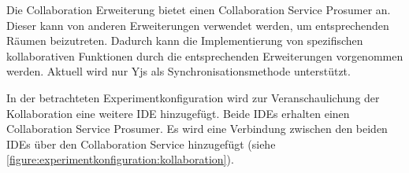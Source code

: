 Die Collaboration Erweiterung bietet einen Collaboration Service Prosumer an. Dieser kann von anderen Erweiterungen verwendet werden, um entsprechenden Räumen beizutreten. Dadurch kann die Implementierung von spezifischen kollaborativen Funktionen durch die entsprechenden Erweiterungen vorgenommen werden. Aktuell wird nur Yjs als Synchronisationsmethode unterstützt.

In der betrachteten Experimentkonfiguration wird zur Veranschaulichung der Kollaboration eine weitere IDE hinzugefügt. Beide IDEs erhalten einen Collaboration Service Prosumer. Es wird eine Verbindung zwischen den beiden IDEs über den Collaboration Service hinzugefügt (siehe \autoref{figure:experimentkonfiguration:kollaboration}).